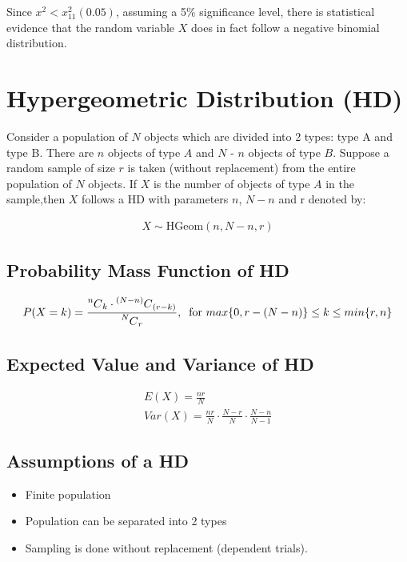 \documentclass{article}
\newcommand\Mycomb[2][^n]{\prescript{#1\mkern-0.5mu}{}C_{#2}}
\begin{document}
Since $ x^2 < x^2_{11}(0.05) $, assuming a 5\% significance level,
there is statistical evidence that
the random variable $ X $ does in fact follow a negative binomial
distribution.

\section{Hypergeometric Distribution (HD)}
Consider a population of $N$ objects which are divided into 2 types: type A and type B.
There are
$n$ objects of type $A$ and $N$ - $n$ objects of type $B$.
Suppose a random sample of size $r$ is taken
(without replacement) from the entire population of $N$ objects. If $X$ 
is the number of objects of
type $A$ in the sample,then $X$ follows a HD with parameters $n$, 
$N-n$ and r denoted by:

\begin{gather*}
  X \sim \text{HGeom}(n, N-n, r)
\end{gather*}

\subsection{Probability Mass Function of HD}

\begin{gather*}
  P(X=k) =  \frac{\Mycomb[n]{k} \cdot \Mycomb[(N-n)]{(r-k)}}
  {\Mycomb[N]{r}}, \; \;
  \text{for } max\{ 0, r - (N - n) \} \leq k \leq min\{r, n\}
\end{gather*}


\subsection{Expected Value and Variance of HD}
\begin{gather*}
  E(X) = \frac{nr}{N} \\[5pt]
  Var(X) = \frac{nr}{N} \cdot \frac{N -r}{N} \cdot \frac{N-n}{N-1}
\end{gather*}

\subsection{Assumptions of a HD}
\begin{itemize}
  \item Finite population
  \item Population can be separated into 2 types
  \item Sampling is done without replacement (dependent trials).
\end{itemize}
\end{document}
